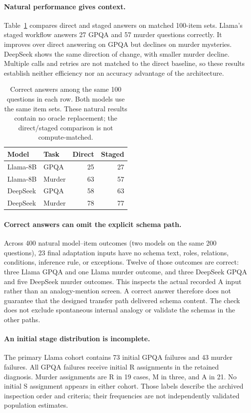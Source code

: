 \paragraph{Natural performance gives context.}
Table~\ref{tab:natural} compares direct and staged answers on matched 100-item sets. Llama's staged workflow answers 27 GPQA and 57 murder questions correctly. It improves over direct answering on GPQA but declines on murder mysteries. DeepSeek shows the same direction of change, with smaller murder decline. Multiple calls and retries are not matched to the direct baseline, so these results establish neither efficiency nor an accuracy advantage of the architecture.

\begin{table}[t]
\centering\small
\begin{tabular}{@{}llrr@{}}
\toprule
Model & Task & Direct & Staged \\
\midrule
Llama-8B & GPQA & 25 & 27 \\
Llama-8B & Murder & 63 & 57 \\
DeepSeek & GPQA & 58 & 63 \\
DeepSeek & Murder & 78 & 77 \\
\bottomrule
\end{tabular}
\caption{Correct answers among the same 100 questions in each row. Both models use the same item sets. These natural results contain no oracle replacement; the direct/staged comparison is not compute-matched.}
\label{tab:natural}
\end{table}

\paragraph{Correct answers can omit the explicit schema path.}
Across 400 natural model--item outcomes (two models on the same 200 questions), 23 final adaptation inputs have no schema text, roles, relations, conditions, inference rule, or exceptions. Twelve of those outcomes are correct: three Llama GPQA and one Llama murder outcome, and three DeepSeek GPQA and five DeepSeek murder outcomes. This inspects the actual recorded A input rather than an analogy-mention screen. A correct answer therefore does not guarantee that the designed transfer path delivered schema content. The check does not exclude spontaneous internal analogy or validate the schemas in the other paths.

\paragraph{An initial stage distribution is incomplete.}
The primary Llama cohort contains 73 initial GPQA failures and 43 murder failures. All GPQA failures receive initial R assignments in the retained diagnosis. Murder assignments are R in 19 cases, M in three, and A in 21. No initial S assignment appears in either cohort. Those labels describe the archived inspection order and criteria; their frequencies are not independently validated population estimates.

